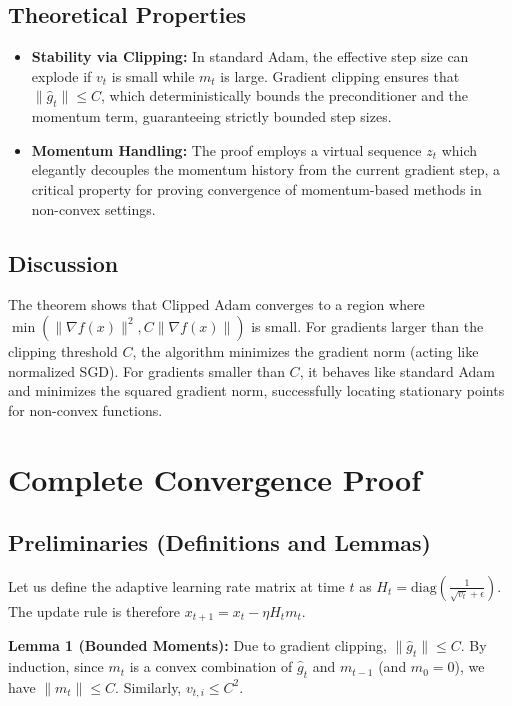 \documentclass{article}
\begin{document}
\subsection*{Theoretical Properties}
\begin{itemize}
    \item \textbf{Stability via Clipping:} In standard Adam, the effective step size can explode if $v_t$ is small while $m_t$ is large. Gradient clipping ensures that $\|\hat{g}_t\| \leq C$, which deterministically bounds the preconditioner and the momentum term, guaranteeing strictly bounded step sizes.
    \item \textbf{Momentum Handling:} The proof employs a virtual sequence $z_t$ which elegantly decouples the momentum history from the current gradient step, a critical property for proving convergence of momentum-based methods in non-convex settings.
\end{itemize}

\subsection*{Discussion}
The theorem shows that Clipped Adam converges to a region where $\min(\|\nabla f(x)\|^2, C \|\nabla f(x)\|)$ is small. For gradients larger than the clipping threshold $C$, the algorithm minimizes the gradient norm (acting like normalized SGD). For gradients smaller than $C$, it behaves like standard Adam and minimizes the squared gradient norm, successfully locating stationary points for non-convex functions.

\section*{Complete Convergence Proof}

\subsection*{Preliminaries (Definitions and Lemmas)}

Let us define the adaptive learning rate matrix at time $t$ as $H_t = \text{diag}\left(\frac{1}{\sqrt{v_t} + \epsilon}\right)$. The update rule is therefore $x_{t+1} = x_t - \eta H_t m_t$.

\textbf{Lemma 1 (Bounded Moments):} Due to gradient clipping, $\|\hat{g}_t\| \leq C$. By induction, since $m_t$ is a convex combination of $\hat{g}_t$ and $m_{t-1}$ (and $m_0=0$), we have $\|m_t\| \leq C$. Similarly, $v_{t,i} \leq C^2$.
\end{document}
